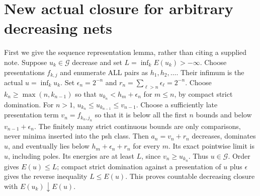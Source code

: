 \documentclass[11pt]{article}
\newcommand{\G}{\mathcal G}
\theoremstyle{remark}\newtheorem{remark}[theorem]{Remark}
\begin{document}
\section{New actual closure for arbitrary decreasing nets}
First we give the sequence representation lemma, rather than citing a
supplied note. Suppose $u_k\in\G$ decrease and set
$L=\inf_k E(u_k)>-\infty$. Choose presentations $f_{k,j}$ and enumerate ALL pairs as
$h_1,h_2,\ldots$. Their infimum is the actual $u=\inf_k u_k$.
Set $\epsilon_n=2^{-n}$ and $r_n=\sum_{\ell>n}\epsilon_\ell=2^{-n}$.
Choose $k_n\ge\max(n,k_{n-1})$ so that
$u_{k_n}<h_m+\epsilon_n$ for $m\le n$, by compact strict domination.
For $n>1$, $u_{k_n}\le u_{k_{n-1}}\le v_{n-1}$.
Choose a sufficiently late presentation term $v_n=f_{k_n,j_n}$ so
that it is below all the first $n$ bounds and below
$v_{n-1}+\epsilon_n$. The finitely many strict continuous bounds are
only comparisons, never minima inserted into the psh class.
Then $a_n=v_n+r_n$ decreases, dominates $u$, and eventually lies
below $h_m+\epsilon_n+r_n$ for every $m$. Its exact pointwise limit
is $u$, including poles. Its energies are at least $L$, since
$v_n\ge u_{k_n}$. Thus $u\in\G$. Order gives $E(u)\le L$;
compact strict domination against a presentation of $u$ plus
$\epsilon$ gives the reverse inequality $L\le E(u)$. This proves
countable decreasing closure with $E(u_k)\downarrow E(u)$.
\end{document}
